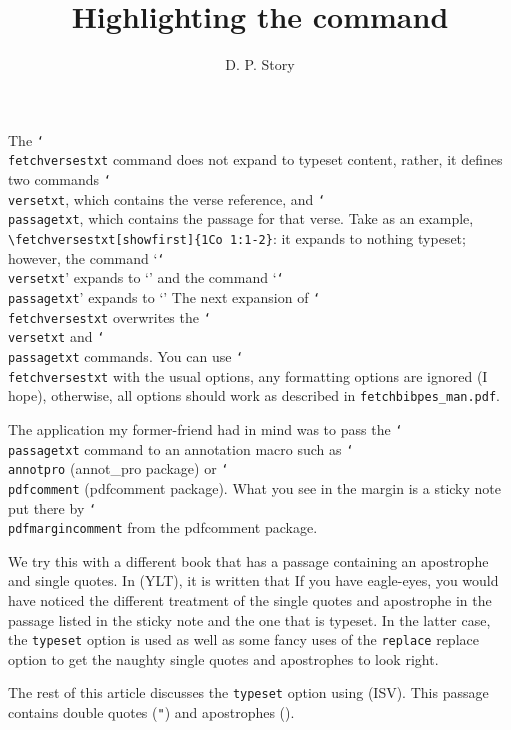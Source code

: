 \documentclass{article}
\title{Highlighting the \texorpdfstring{\protect
  \cs{fetchversestxt}}{\textbackslash{fetchversestxt}} command}
\author{D. P. Story}
\def\cs#1{\texttt{\char`\\#1}}
\let\pkg\textsf
\begin{document}
\maketitle

The \cs{fetchversestxt} command does not expand to typeset content, rather,
it defines two commands \cs{versetxt}, which contains the verse reference,
and \cs{passagetxt}, which contains the passage for that verse. Take as an
example, \verb~\fetchversestxt[showfirst]{1Co 1:1-2}~:
it expands to nothing typeset; however, the command `\cs{versetxt}' expands
to `\versetxt' and the command `\cs{passagetxt}' expands to `\passagetxt' The
next expansion of \cs{fetchversestxt} overwrites the \cs{versetxt} and
\cs{passagetxt} commands. You can use \cs{fetchversestxt} with the usual
options, any formatting options are ignored (I hope), otherwise, all options
should work as described in \texttt{fetchbibpes\_man.pdf}.

The application\pdfmargincomment[author={\versetxt}]{\passagetxt}
my former-friend had in mind was to pass the \cs{passagetxt} command to an
annotation macro such as \cs{annotpro} (\pkg{annot\_pro} package) or
\cs{pdfcomment} (\pkg{pdfcomment} package). What you see in the margin is a
sticky note put there by  \cs{pdfmargincomment} from the \pkg{pdfcomment}
package.

We try this with a different book that has a passage containing an apostrophe
and single quotes.\pdfmargincomment[author={\versetxt}]{\passagetxt}
In\eSQ{}
\versetxt\space(YLT), it is written that \textsl{\passagetxt} If you have
eagle-eyes, you would have noticed the different treatment of the single
quotes and apostrophe in the passage listed in the sticky note and the one
that is typeset. In the latter case, the \texttt{typeset} option is used as
well as some fancy uses of the \texttt{replace} replace option to get the
naughty single quotes and apostrophes to look right.

The rest of this article discusses the \texttt{typeset} option using
\versetxt\space(ISV).\pdfmargincomment[author={\versetxt}]{\passagetxt}
This passage contains double quotes (\texttt{"}) and apostrophes (\texttt{}).
\end{document}
